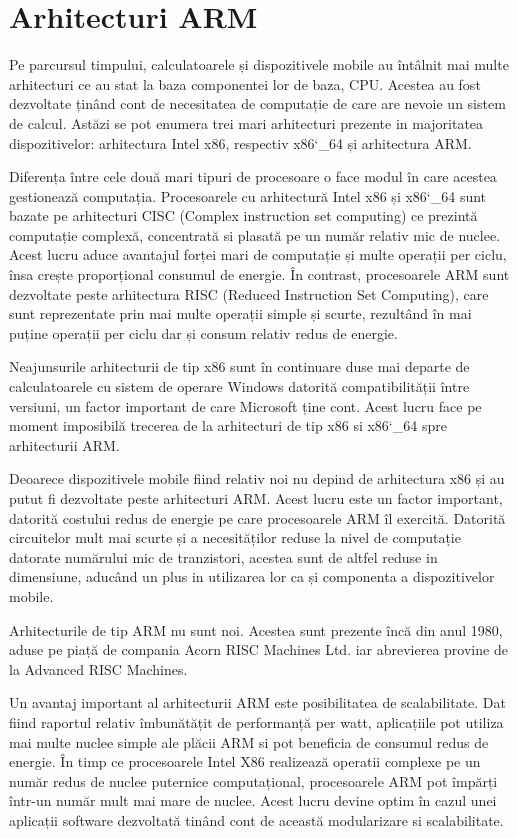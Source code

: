 	\section{Arhitecturi ARM}
	Pe parcursul timpului, calculatoarele și dispozitivele mobile au întâlnit mai multe arhitecturi ce au stat la baza componentei lor de baza, CPU. Acestea au fost dezvoltate ținând cont de necesitatea de computație de care are nevoie un sistem de calcul. Astăzi se pot enumera trei mari arhitecturi prezente in majoritatea dispozitivelor: arhitectura Intel x86, respectiv x86\char`_64 și arhitectura ARM. 
	
	Diferența între cele două mari tipuri de procesoare o face modul în care acestea gestionează computația. Procesoarele cu arhitectură Intel x86 și x86\char`_64 sunt bazate pe arhitecturi CISC (Complex instruction set computing) ce prezintă computație complexă, concentrată si plasată pe un număr relativ mic de nuclee. Acest lucru aduce avantajul forței mari de computație și multe operații per ciclu, însa crește proporțional consumul de energie. În contrast, procesoarele ARM sunt dezvoltate peste arhitectura RISC (Reduced Instruction Set Computing), care sunt reprezentate prin mai multe operații simple și scurte, rezultând în mai puține operații per ciclu dar și consum relativ redus de energie. 
	
	Neajunsurile arhitecturii de tip x86 sunt în continuare duse mai departe de calculatoarele cu sistem de operare Windows datorită compatibilității între versiuni, un factor important de care Microsoft ține cont. Acest lucru face pe moment imposibilă trecerea de la arhitecturi de tip x86 si x86\char`_64 spre arhitecturii ARM. 
	
	Deoarece dispozitivele mobile fiind relativ noi nu depind de arhitectura x86 și au putut fi dezvoltate peste arhitecturi ARM. Acest lucru este un factor important, datorită costului redus de energie pe care procesoarele ARM îl exercită. Datorită circuitelor mult mai scurte și a necesităților reduse la nivel de computație datorate numărului mic de tranzistori, acestea sunt de altfel reduse in dimensiune, aducând un plus in utilizarea lor ca și componenta a dispozitivelor mobile.
	
	Arhitecturile de tip ARM nu sunt noi. Acestea sunt prezente încă din anul 1980, aduse pe piață de compania Acorn RISC Machines Ltd. iar abrevierea provine de la Advanced RISC Machines. 
	
	Un avantaj important al arhitecturii ARM este posibilitatea de scalabilitate. Dat fiind raportul relativ îmbunătățit de performanță per watt, aplicațiile pot utiliza mai multe nuclee simple ale plăcii ARM si pot beneficia de consumul redus de energie. În timp ce procesoarele 
	Intel X86 realizează operatii complexe pe un număr redus de nuclee puternice computațional, procesoarele ARM pot împărți într-un număr mult mai mare de nuclee. Acest lucru devine optim în cazul unei aplicații software dezvoltată tinând cont de această modularizare si scalabilitate.
	\cite{arm_architecture_android}
	
